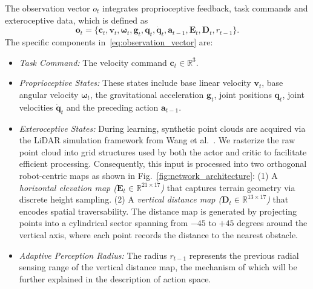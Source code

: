 \documentclass[letterpaper, 10 pt, conference]{ieeeconf/ieeeconf}
\DeclareRobustCommand{\RevisionAdd}[1]{{\color{red}#1}}
\begin{document}
The observation vector $o_t$ integrates proprioceptive feedback, task commands and exteroceptive data, which is defined as
\begin{equation}
\mathbf{o}_t = \{
\mathbf{c}_t, 
\mathbf{v}_t, \boldsymbol{\omega}_t, \mathbf{g}_t, \mathbf{q}_t, \dot{\mathbf{q}}_t, \mathbf{a}_{t-1},
\mathbf{E}_t, \mathbf{D}_t, r_{t-1}
\}.
\label{eq:observation_vector}
\end{equation}
The specific components in~\eqref{eq:observation_vector} are:
\begin{itemize}
    \item \textit{Task Command:} The velocity command $\mathbf{c}_t \in \mathbb{R}^3$.
    \item \textit{Proprioceptive States:} These states include base linear velocity $\mathbf{v}_t$, base angular velocity $\boldsymbol{\omega}_t$, the gravitational acceleration $\mathbf{g}_t$, joint positions $\mathbf{q}_t$, joint velocities $\dot{\mathbf{q}}_t$ and the preceding action $\mathbf{a}_{t-1}$.
    \item \textit{Exteroceptive States:} \RevisionAdd{During learning, synthetic point clouds are }acquired via the LiDAR simulation framework from Wang et al.~\cite{Wang_2025_Omni-Perception}.
    We rasterize the raw point cloud into grid structures \RevisionAdd{used by both the actor and critic }to facilitate efficient processing. Consequently, this input is processed into two orthogonal robot-centric maps as shown in Fig.~\ref{fig:network_architecture}:
    (1) A \textit{horizontal elevation map ($\mathbf{E}_t \in \mathbb{R}^{21 \times 17}$)} that captures terrain geometry via discrete height sampling.
    (2) A \textit{vertical distance map ($\mathbf{D}_t \in \mathbb{R}^{13 \times 17}$)} that encodes spatial traversability. The distance map is generated by projecting points into a cylindrical sector spanning from $-45$ to $+45$ degrees around the vertical axis, where each point records the distance to the nearest obstacle.
    \item \textit{Adaptive Perception Radius:} 
    \RevisionAdd{The radius $r_{t-1}$ represents the previous radial sensing range of the vertical distance map, the mechanism of which will be further explained in the description of action space.}

\end{itemize}
\end{document}
